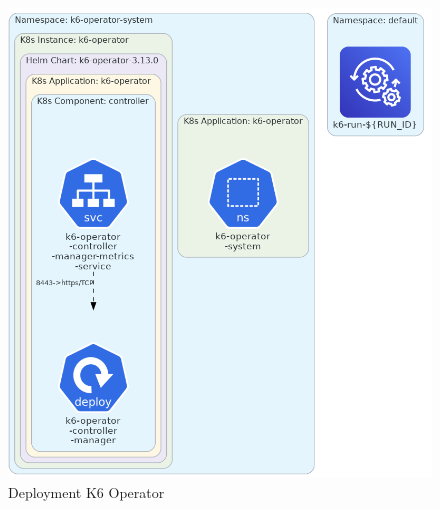 \begin{figure}[H]
    \centering
    \includegraphics[width=1\textwidth]{resources/chapter-4/k6-operator.png}
    \caption{Deployment K6 Operator}
    \label{fig:deployment-k6-operator}
\end{figure}

\pagebreak